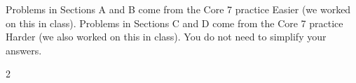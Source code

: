 \documentclass[9pt]{article}
\begin{document}
\small
Problems in Sections A and B come from the Core 7 practice Easier (we worked on this in class). Problems in Sections C and D come from the Core 7 practice Harder (we also worked on this in class). \newline
You do not need to simplify your answers. 

\begin{multicols}{2}




\end{multicols}
\end{document}
